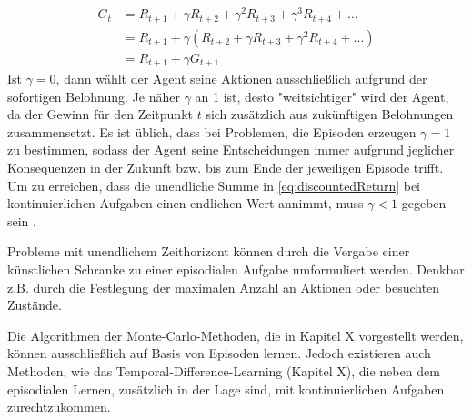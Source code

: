 \begin{equation}\label{eq:successiveReturn}
    \begin{aligned}
    G_t &= R_{t+1} + \gamma R_{t+2} + \gamma^2 R_{t+3} + \gamma^3 R_{t+4} + \dots \\
    &= R_{t+1} + \gamma (R_{t+2} + \gamma R_{t+3} + \gamma^2 R_{t+4} + \dots)  \\
   & = R_{t+1} + \gamma G_{t+1}
    \end{aligned}
\end{equation}
Ist $\gamma = 0$, dann wählt der Agent seine Aktionen ausschließlich aufgrund der sofortigen Belohnung. Je näher $\gamma$ an 1 ist, desto "weitsichtiger" wird der Agent, da der Gewinn für den Zeitpunkt $t$ sich zusätzlich aus zukünftigen Belohnungen zusammensetzt. Es ist üblich, dass bei Problemen, die Episoden erzeugen $\gamma = 1$ zu bestimmen, sodass der Agent seine Entscheidungen immer aufgrund jeglicher Konsequenzen in der Zukunft bzw. bis zum Ende der jeweiligen Episode trifft. Um zu erreichen, dass die unendliche Summe in \eqref{eq:discountedReturn} bei kontinuierlichen Aufgaben einen endlichen Wert annimmt, muss $\gamma < 1$ gegeben sein \cite[S.55]{Sutton1998}. 
\par 
Probleme mit unendlichem Zeithorizont können durch die Vergabe einer künstlichen Schranke zu einer episodialen Aufgabe umformuliert werden. Denkbar z.B. durch die Festlegung der maximalen Anzahl an Aktionen oder besuchten Zustände. 
\par 
Die Algorithmen der Monte-Carlo-Methoden, die in Kapitel X vorgestellt werden, können ausschließlich auf Basis von Episoden lernen. Jedoch existieren auch Methoden, wie das Temporal-Difference-Learning (Kapitel X), die neben dem episodialen Lernen, zusätzlich in der Lage sind, mit kontinuierlichen Aufgaben zurechtzukommen. 